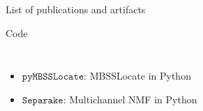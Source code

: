 \begin{frame}{List of publications and artifacts}
\begin{block}{Code}
\begin{columns}[T,onlytextwidth]
            \begin{itemize}\small
                \item $\mathtt{pyMBSSLocate}$: MBSSLocate in Python
                \item $\mathtt{Separake}$: Multichannel NMF in Python
            \end{itemize}

            \pause
            \begin{center}
            \end{center}

        \end{columns}
    \end{block}

\end{frame}